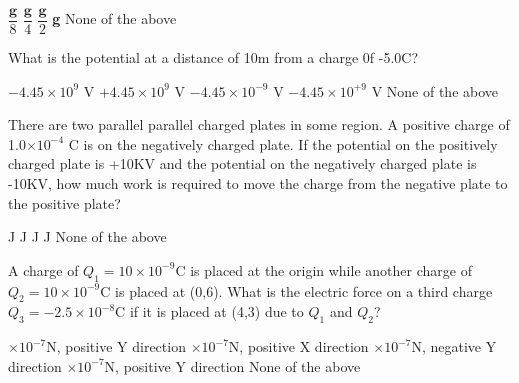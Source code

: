 \documentclass[12pt,addpoints]{exam}
\begin{document}
{{{\begin{questions}
					\begin{oneparchoices}
						\choice $\dfrac{\textbf{g}}{8}$
						\choice $\dfrac{\textbf{g}}{4}$
						\choice $\dfrac{\textbf{g}}{2}$
						\choice \textbf{g}
						\choice None of the above
					\end{oneparchoices}
					\question What is the potential at a distance of 10m from a charge 0f -5.0C?\\
					\begin{oneparchoices}
						\choice $-4.45\times10^{9}$ V
						\choice $+4.45\times10^{9}$ V
						\choice $-4.45\times10^{-9}$ V
						\choice $-4.45\times10^{+9}$ V
						\choice None of the above
					\end{oneparchoices}
					\question There are two parallel parallel charged plates in some region. A positive charge of 1.0$\times10^{-4}$ C is on the negatively charged plate. If the potential on the positively charged plate is +10KV and the potential on the negatively charged plate is -10KV, how much work is required to move the charge from the negative plate to the positive plate?\\
					\begin{oneparchoices}
						\choice 2.0 J
						\choice 0.0 J
						\choice 4.0 J
						\choice 1.0 J
						\choice None of the above
					\end{oneparchoices} 
					\question A charge of $Q_1=10\times10^{-9}$C is placed at the origin while another charge of $Q_2=10\times10^{-9}$C is placed at (0,6). What is the electric force on a third charge $Q_3=-2.5\times10^{-8}$C if it is placed at (4,3) due to $Q_1$ and $Q_2$?\\
					\begin{oneparchoices}
						$\times10^{-7}$N, positive Y direction 
						$\times10^{-7}$N, positive X direction
						$\times10^{-7}$N, negative Y direction
						$\times10^{-7}$N, positive Y direction
						\choice None of the above
					\end{oneparchoices}

\end{questions}}}}
\end{document}
